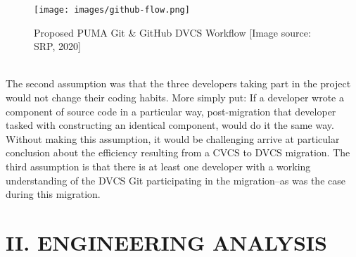 \documentclass{article}
\begin{document}
{\begin{figure}[h]
\centering
\texttt{[image: images/github-flow.png]}
\caption{Proposed PUMA Git \& GitHub DVCS Workflow [Image source: SRP, 2020]}
\end{figure}
\\
\indent
The second assumption was that the three developers taking part in the project would not change their coding habits. More simply put: If a developer wrote a component of source code in a particular way, post-migration that developer tasked with constructing an identical component, would do it the same way. Without making this assumption, it would be challenging arrive at particular conclusion about the  efficiency resulting from a CVCS to DVCS migration. The third assumption is that there is at least one developer with a working understanding of the DVCS Git participating in the migration--as was the case during this migration.
}
\newpage
\centering
\section*{II. ENGINEERING ANALYSIS}
\justify
\end{document}
